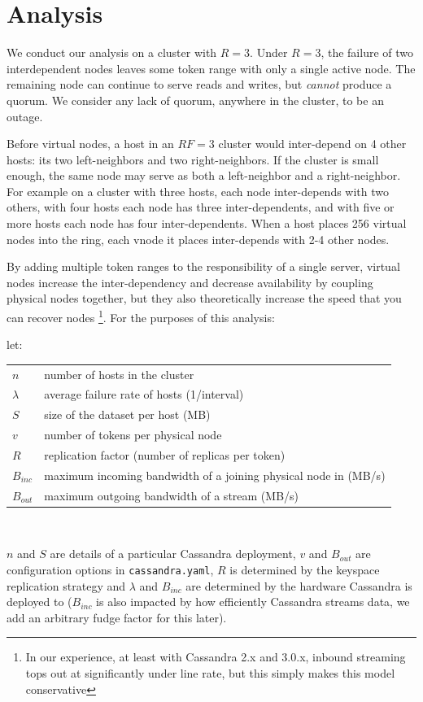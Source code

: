 \documentclass{article}
\makeatletter
\newenvironment{conditions}[1][let:]
  {#1 \begin{tabular}[t]{>{$}l<{$} @{${}={}$} l}}
  {\end{tabular}\\[\belowdisplayskip]}
\makeatother
\begin{document}
\section{Analysis}
\label{sec:analysis}
We conduct our analysis on a cluster with $R=3$. Under $R=3$, the failure of
two interdependent nodes leaves some token range with only a single active node.
The remaining node can continue to serve reads and writes, but \emph{cannot}
produce a quorum. We consider any lack of quorum, anywhere in the cluster, to
be an outage.

Before virtual nodes, a host in an $RF=3$ cluster would inter-depend on 4
other hosts: its two left-neighbors and two right-neighbors. If the cluster
is small enough, the same node may serve as both a left-neighbor and a
right-neighbor. For example on a cluster with three hosts, each node
inter-depends with two others, with four hosts each node has three
inter-dependents, and with five or more hosts each node has four
inter-dependents. When a host places 256 virtual nodes into the ring, each
vnode it places inter-depends with 2-4 other nodes.

By adding multiple token ranges to the responsibility of a single server,
virtual nodes increase the inter-dependency and decrease availability by
coupling physical nodes together, but they also theoretically increase the
speed that you can recover nodes \footnote{In our experience, at least with
Cassandra 2.x and 3.0.x, inbound streaming tops out at significantly under
line rate, but this simply makes this model conservative}.
For the purposes of this analysis:

\begin{conditions}
 n       &  number of hosts in the cluster \\
 \lambda &  average failure rate of hosts (1/interval) \\
 S       &  size of the dataset per host (MB) \\
 v       &  number of tokens per physical node \\
 R       &  replication factor (number of replicas per token) \\
 B_{inc} &  maximum incoming bandwidth of a joining physical node in (MB/s) \\
 B_{out} &  maximum outgoing bandwidth of a stream (MB/s) \\
\end{conditions}

$n$ and $S$ are details of a particular Cassandra deployment, $v$ and $B_{out}$
are configuration options in \texttt{cassandra.yaml}, $R$ is determined by the
keyspace replication strategy and $\lambda$ and $B_{inc}$ are determined by the
hardware Cassandra is deployed to ($B_{inc}$ is also impacted by how efficiently
Cassandra streams data, we add an arbitrary fudge factor for this later).
\end{document}
